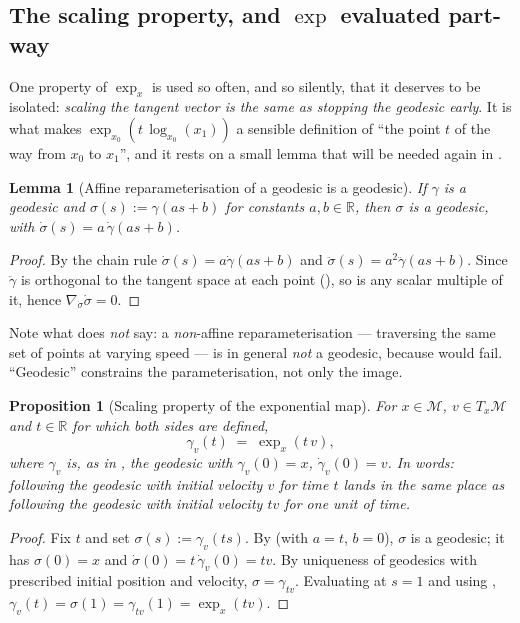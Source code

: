 \documentclass[11pt,a4paper]{report}
\newtheorem{proposition}[proposition]{Proposition}
\newtheorem{lemma}[lemma]{Lemma}
\theoremstyle{definition}
\theoremstyle{remark}
\newcommand{\RR}{\mathbb R}
\begin{document}
\subsection{The scaling property, and $\exp$ evaluated part-way}
\label{sec:exp-scaling}

One property of $\exp_x$ is used so often, and so silently, that it deserves
to be isolated: \emph{scaling the tangent vector is the same as stopping the
geodesic early}. It is what makes $\exp_{x_0}(t\,\log_{x_0}(x_1))$ a sensible
definition of ``the point $t$ of the way from $x_0$ to $x_1$'', and it rests
on a small lemma that will be needed again in
.

\begin{lemma}[Affine reparameterisation of a geodesic is a geodesic]
\label{lem:geodesic-reparam}
If $\gamma$ is a geodesic and $\sigma(s):=\gamma(as+b)$ for constants
$a,b\in\RR$, then $\sigma$ is a geodesic, with
$\dot\sigma(s)=a\,\dot\gamma(as+b)$.
\end{lemma}

\begin{proof}
By the chain rule $\dot\sigma(s)=a\dot\gamma(as+b)$ and
$\ddot\sigma(s)=a^2\ddot\gamma(as+b)$. Since $\ddot\gamma$ is orthogonal to
the tangent space at each point (), so is any
scalar multiple of it, hence $\nabla_{\dot\sigma}\dot\sigma=0$.
\end{proof}

Note what  does \emph{not} say: a
\emph{non}-affine reparameterisation --- traversing the same set of points at
varying speed --- is in general \emph{not} a geodesic, because
 would fail. ``Geodesic'' constrains the
parameterisation, not only the image.

\begin{proposition}[Scaling property of the exponential map]
\label{prop:exp-scaling}
For $x\in\mathcal M$, $v\in T_x\mathcal M$ and $t\in\RR$ for which both
sides are defined,
\[
\gamma_v(t) \;=\; \exp_x(t\,v) ,
\]
where $\gamma_v$ is, as in , the geodesic with
$\gamma_v(0)=x$, $\dot\gamma_v(0)=v$. In words: following the geodesic with
initial velocity $v$ for time $t$ lands in the same place as following the
geodesic with initial velocity $tv$ for one unit of time.
\end{proposition}

\begin{proof}
Fix $t$ and set $\sigma(s):=\gamma_v(ts)$. By 
(with $a=t$, $b=0$), $\sigma$ is a geodesic; it has $\sigma(0)=x$ and
$\dot\sigma(0)=t\,\dot\gamma_v(0)=tv$. By uniqueness of geodesics with
prescribed initial position and velocity, $\sigma=\gamma_{tv}$. Evaluating at
$s=1$ and using ,
$\gamma_v(t)=\sigma(1)=\gamma_{tv}(1)=\exp_x(tv)$.
\end{proof}
\end{document}
